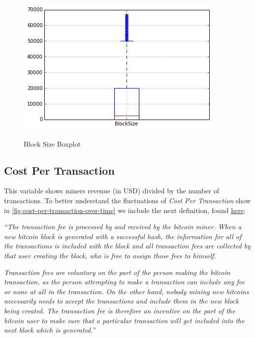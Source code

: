 \begin{figure}[bth]
  \myfloatalign
  {\includegraphics[width=1\linewidth]
    {gfx/block-size-boxplot}}
  \caption{Block Size Boxplot}
  \label{fig:block-size-boxplot}
\end{figure}

\clearpage

\subsection{Cost Per Transaction}
\label{sec:cost-per-transaction}

This variable shows miners revenue (in USD) divided by the number of
transactions. To better understand the fluctuations of \textit{Cost
  Per Transaction} show in
\autoref{fig:cost-per-transaction-over-time} we include the next
definition, found
\href{https://en.bitcoin.it/wiki/Transaction_fees}{here}:

\textit{``The transaction fee is processed by and received by the
  bitcoin miner. When a new bitcoin block is generated with a
  successful hash, the information for all of the transactions is
  included with the block and all transaction fees are collected by
  that user creating the block, who is free to assign those fees to
  himself.}

\textit{Transaction fees are voluntary on the part of the person
  making the bitcoin transaction, as the person attempting to make a
  transaction can include any fee or none at all in the transaction.
  On the other hand, nobody mining new bitcoins necessarily needs to
  accept the transactions and include them in the new block being
  created. The transaction fee is therefore an incentive on the part
  of the bitcoin user to make sure that a particular transaction will
  get included into the next block which is generated.''}

